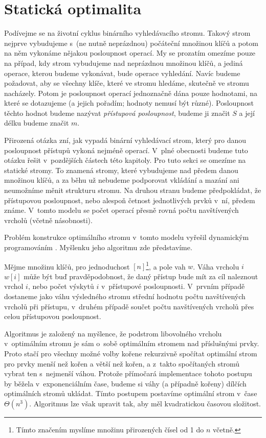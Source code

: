 \section{Statická optimalita}\label{sec:staticoptimality}

Podívejme se na životní cyklus binárního vyhledávacího stromu. Takový strom
nejprve vybudujeme s~(ne nutně neprázdnou) počáteční množinou klíčů
a potom na něm vykonáme nějakou posloupnost operací. My se prozatím omezíme
pouze na případ, kdy strom vybudujeme nad neprázdnou množinou klíčů, a jediná
operace, kterou budeme vykonávat, bude operace vyhledání. Navíc budeme
požadovat, aby se všechny klíče, které ve stromu hledáme, skutečně ve stromu nacházely.
Potom je posloupnost operací jednoznačně dána pouze hodnotami, na které se
dotazujeme (a jejich pořadím; hodnoty nemusí být různé). Posloupnost těchto
hodnot budeme nazývat \emph{přístupová posloupnost}, budeme ji značit $S$ a
její délku budeme značit $m$.

Přirozená otázka zní, jak vypadá binární vyhledávací strom, který pro danou
posloupnost přístupů vykoná nejméně operací. V~plné obecnosti budeme tuto otázku řešit v~pozdějších částech této kapitoly. Pro tuto sekci se omezíme na statické
stromy. To znamená stromy, které vybudujeme nad předem danou množinou klíčů, a
za běhu už nebudeme podporovat vkládání a mazání ani neumožníme měnit
strukturu stromu. Na druhou stranu budeme předpokládat, že přístupovou posloupnost, nebo alespoň četnost jednotlivých prvků v~ní, předem známe. V~tomto modelu se počet operací přesně rovná
počtu navštívených vrcholů (včetně násobnosti).

Problém konstrukce optimálního stromu v~tomto modelu vyřešil dynamickým
programováním \citet{staticoptimality}. Myšlenku jeho algoritmu zde představíme.

Mějme množinu klíčů, pro jednoduchost $[n]$\footnote{Tímto značením myslíme
množinu přirozených čísel od 1 do $n$ včetně.}, a pole vah $w$. Váha vrcholu
$i$ $w[i]$ může být buď pravděpodobnost, že daný přístup bude mít za
cíl naleznout vrchol $i$, nebo počet výskytů $i$ v~přístupové
posloupnosti. V~prvním případě dostaneme jako váhu výsledného stromu střední
hodnotu počtu navštívených vrcholů při přístupu, v~druhém případě součet počtu navštívených vrcholů přes
celou přístupovou posloupnost.

Algoritmus je založený na myšlence, že podstrom libovolného vrcholu
v~optimálním stromu je sám o~sobě optimálním stromem nad příslušnými prvky. Proto
stačí pro všechny možné volby kořene rekurzivně spočítat optimální strom pro
prvky menší než kořen a větší než kořen, a z~takto spočítaných stromů vybrat
ten s~nejmenší váhou. Protože přímočará implementace tohoto postupu by běžela
v~exponenciálním čase, budeme si váhy (a případně kořeny) dílčích optimálních
stromů ukládat. Tímto postupem postavíme optimální strom
v~čase $\Theta(n^3)$. Algoritmus lze však upravit tak, aby měl kvadratickou časovou složitost.



